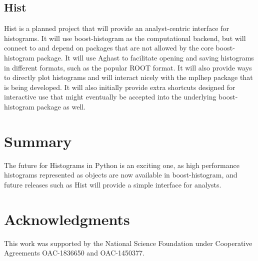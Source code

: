 \documentclass{webofc}
\begin{document}
\subsection{Hist}
\label{sec-hist}

Hist is a planned project that will provide an analyst-centric interface for histograms. It will use boost-histogram as the computational backend, but will connect to and depend on packages that are not allowed by the core boost-histogram package. It will use Aghast to facilitate opening and saving histograms in different formats, such as the popular ROOT format. It will also provide ways to directly plot histograms and will interact nicely with the mplhep package that is being developed. It will also initially provide extra shortcuts designed for interactive use that might eventually be accepted into the underlying boost-histogram package as well.


\section{Summary}
\label{sec-4}


The future for Histograms in Python is an exciting one, as high performance histograms represented as objects are now available in boost-histogram, and future releases such as Hist will provide a simple interface for analysts.

\section{Acknowledgments}

This work was supported by the National Science Foundation under Cooperative Agreements OAC-1836650 and OAC-1450377.


\end{document}
